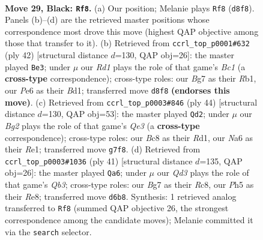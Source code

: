 \documentclass[11pt]{article}
\begin{document}
\clearpage

\begin{figure}[p]\centering
\begin{subfigure}{0.46\textwidth}\centering
\resizebox{\linewidth}{!}{%
\newchessgame
\chessboard[
  setfen={r1br4/pp3pbk/n2qpnp1/P2p2Bp/B2P3P/6P1/RPPNQP2/1N2R1K1 b - - 12 29},
  showmover=false,
  pgfstyle=straightmove, color=movearrow, markmove={d8-f8}
]}
\caption{}
\end{subfigure}\hfill
\begin{subfigure}{0.46\textwidth}\centering
\resizebox{\linewidth}{!}{%
\newchessgame
\chessboard[
  setfen={k1r2br1/1pq2pp1/p1n1p2p/3pP2P/b2P4/PNP2Q2/5PP1/1RBBR1K1 w - - 1 22},
  showmover=false,
  pgfstyle=straightmove, color=movearrow, markmove={c1-e3}
]}
\caption{}
\end{subfigure}
\\[4pt]
\begin{subfigure}{0.46\textwidth}\centering
\resizebox{\linewidth}{!}{%
\newchessgame
\chessboard[
  setfen={3rnr2/kp1b1pp1/p3p3/q1bpP1N1/3N1PBp/P3Q2P/1PP3P1/1K1RR3 w - - 6 23},
  showmover=false,
  pgfstyle=straightmove, color=movearrow, markmove={e3-d2}
]}
\caption{}
\end{subfigure}\hfill
\begin{subfigure}{0.46\textwidth}\centering
\resizebox{\linewidth}{!}{%
\newchessgame
\chessboard[
  setfen={2r1r1k1/1b2bp1p/1q1p1np1/ppnP4/2p5/P1N1B1PP/1PQNPPB1/2RR2K1 b - - 1 21},
  showmover=false,
  pgfstyle=straightmove, color=movearrow, markmove={b6-a6}
]}
\caption{}
\end{subfigure}
\caption{\textbf{Move 29, Black: \texttt{Rf8}.} (a) Our position; Melanie plays \texttt{Rf8} (\texttt{d8f8}). Panels (b)--(d) are the retrieved master positions whose correspondence most drove this move (highest QAP objective among those that transfer to it). (b) Retrieved from \texttt{ccrl\_top\_p0001\#632} (ply 42) [structural distance $d$=130, QAP obj=26]: the master played \texttt{Be3}; under $\mu$ our \emph{Rd1} plays the role of that game's \emph{Bc1} (a \textbf{cross-type} correspondence); cross-type roles: our \emph{B}g7 as their \emph{R}b1, our \emph{P}e6 as their \emph{B}d1; transferred move \texttt{d8f8} \textbf{(endorses this move)}. (c) Retrieved from \texttt{ccrl\_top\_p0003\#846} (ply 44) [structural distance $d$=130, QAP obj=53]: the master played \texttt{Qd2}; under $\mu$ our \emph{Bg2} plays the role of that game's \emph{Qe3} (a \textbf{cross-type} correspondence); cross-type roles: our \emph{B}c8 as their \emph{R}d1, our \emph{N}a6 as their \emph{R}e1; transferred move \texttt{g7f8}. (d) Retrieved from \texttt{ccrl\_top\_p0003\#1036} (ply 41) [structural distance $d$=135, QAP obj=26]: the master played \texttt{Qa6}; under $\mu$ our \emph{Qd3} plays the role of that game's \emph{Qb3}; cross-type roles: our \emph{B}g7 as their \emph{R}c8, our \emph{P}h5 as their \emph{R}e8; transferred move \texttt{d6b8}. Synthesis: 1 retrieved analog transferred to \texttt{Rf8} (summed QAP objective 26, the strongest correspondence among the candidate moves); Melanie committed it via the \texttt{search} selector.}
\label{fig:thought-m57}
\end{figure}
\end{document}
